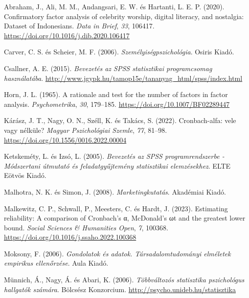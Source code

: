 \documentclass[
  letterpaper,
]{krantz}
\newlength{\cslhangindent}
\newlength{\cslentryspacingunit} %
\newenvironment{CSLReferences}[2] %
 {%
  \setlength{\parindent}{0pt}
  \ifodd #1
  \let\oldpar\par
  \def\par{\hangindent=\cslhangindent\oldpar}
  \fi
  \setlength{\parskip}{#2\cslentryspacingunit}
 }%
 {}
\begin{document}
\hypertarget{refs}{}
\begin{CSLReferences}{1}{0}
\leavevmode{}%
Abraham, J., Ali, M. M., Andangsari, E. W. és Hartanti, L. E. P. (2020).
Confirmatory factor analysis of celebrity worship, digital literacy, and
nostalgia: Dataset of Indonesians. \emph{Data in Brief}, \emph{33},
106417. \url{https://doi.org/10.1016/j.dib.2020.106417}

\leavevmode{}%
Carver, C. S. és Scheier, M. F. (2006). \emph{Személyiségpszichológia}.
Osiris Kiadó.

\leavevmode{}%
Csallner, A. E. (2015). \emph{Bevezetés az SPSS statisztikai
programcsomag használatába}.
\url{http://www.jgypk.hu/tamop15e/tananyag_html/spss/index.html}

\leavevmode{}%
Horn, J. L. (1965). A rationale and test for the number of factors in
factor analysis. \emph{Psychometrika}, \emph{30}, 179--185.
\url{https://doi.org/10.1007/BF02289447}

\leavevmode{}%
Kárász, J. T., Nagy, O. N., Széll, K. és Takács, S. (2022).
Cronbach-alfa: vele vagy nélküle? \emph{Magyar Pszichológiai Szemle},
\emph{77}, 81--98. \url{https://doi.org/10.1556/0016.2022.00004}

\leavevmode{}%
Ketskeméty, L. és Izsó, L. (2005). \emph{Bevezetés az SPSS
programrendszerbe - Módszertani útmutató és feladatgyűjtemény
statisztikai elemzésekhez}. ELTE Eötvös Kiadó.

\leavevmode{}%
Malhotra, N. K. és Simon, J. (2008). \emph{Marketingkutatás}. Akadémiai
Kiadó.

\leavevmode{}%
Malkewitz, C. P., Schwall, P., Meesters, C. és Hardt, J. (2023).
Estimating reliability: A comparison of Cronbach's α, McDonald's ωt and
the greatest lower bound. \emph{Social Sciences \& Humanities Open},
\emph{7}, 100368. \url{https://doi.org/10.1016/j.ssaho.2022.100368}

\leavevmode{}%
Moksony, F. (2006). \emph{Gondolatok és adatok. Társadalomtudományi
elméletek empirikus ellenőrzése}. Aula Kiadó.

\leavevmode{}%
Münnich, Á., Nagy, Á. és Abari, K. (2006). \emph{Többváltozós
statisztika pszichológus hallgatók számára}. Bölcsész Konzorcium.
\url{http://psycho.unideb.hu/statisztika}


\end{CSLReferences}
\end{document}
